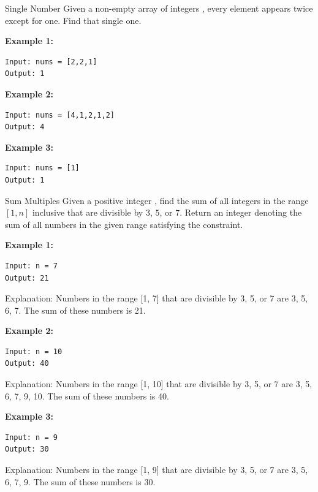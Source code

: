 \documentclass[twoside]{article}
\begin{document}
\begin{task}{Single Number}{}{}
Given a non-empty array of integers , every element appears twice except for one. Find that single one.
\vspace{10pt}

\textbf{Example 1:}
\begin{lstlisting}[numbers=none]
Input: nums = [2,2,1]
Output: 1
\end{lstlisting}
\vspace{10pt}

\textbf{Example 2:}
\begin{lstlisting}[numbers=none]
Input: nums = [4,1,2,1,2]
Output: 4
\end{lstlisting}
\vspace{10pt}

\textbf{Example 3:}
\begin{lstlisting}[numbers=none]
Input: nums = [1]
Output: 1
\end{lstlisting}

\end{task}

\begin{task}{Sum Multiples}{}{}
Given a positive integer , find the sum of all integers in the range $[1, n]$ inclusive that are divisible by $3$, $5$, or $7$.
Return an integer denoting the sum of all numbers in the given range satisfying the constraint.
\vspace{10pt}

\textbf{Example 1:}
\begin{lstlisting}[numbers=none]
Input: n = 7
Output: 21
\end{lstlisting}
Explanation: Numbers in the range [1, 7] that are divisible by 3, 5, or 7 are 3, 5, 6, 7. The sum of these numbers is 21.
\vspace{10pt}

\textbf{Example 2:}
\begin{lstlisting}[numbers=none]
Input: n = 10
Output: 40
\end{lstlisting}
Explanation: Numbers in the range [1, 10] that are divisible by 3, 5, or 7 are 3, 5, 6, 7, 9, 10. The sum of these numbers is 40.
\vspace{10pt}

\textbf{Example 3:}

\begin{lstlisting}[numbers=none]
Input: n = 9
Output: 30
\end{lstlisting}
Explanation: Numbers in the range [1, 9] that are divisible by 3, 5, or 7 are 3, 5, 6, 7, 9. The sum of these numbers is 30.

\end{task}
\end{document}
